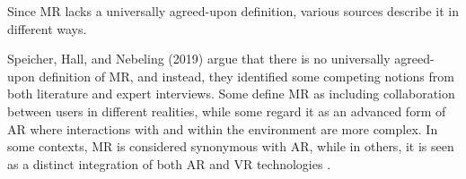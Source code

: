    
    Since \ac{MR} lacks a universally agreed-upon definition, various sources describe it in different ways. 

    Speicher, Hall, and Nebeling (2019) argue that there is no universally agreed-upon definition of \ac{MR}, and instead, they identified some competing notions from both literature and expert interviews.
    Some define \ac{MR} as including collaboration between users in different realities, while some regard it as an advanced form of \ac{AR} where interactions with and within the environment are more complex. In some contexts, \ac{MR} is considered synonymous with \ac{AR}, while in others, it is seen as a distinct integration of both \ac{AR} and \ac{VR} technologies \cite{whatismixedreality}. 


